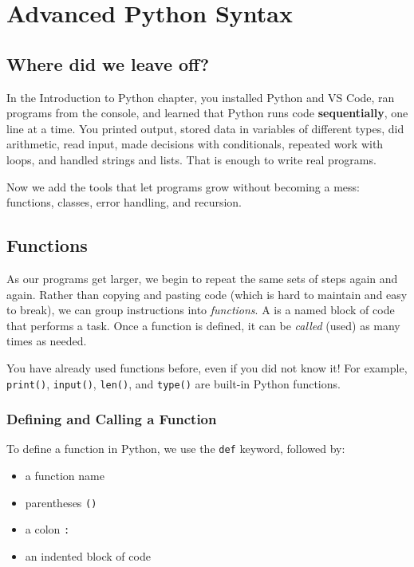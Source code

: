 \chapter{Advanced Python Syntax}
\section{Where did we leave off?}
In the Introduction to Python chapter, you installed Python and VS Code, ran programs from the console, and learned that Python runs code \textbf{sequentially}, one line at a time. You printed output, stored data in variables of different types, did arithmetic, read input, made decisions with conditionals, repeated work with loops, and handled strings and lists. That is enough to write real programs.

Now we add the tools that let programs grow without becoming a mess: functions, classes, error handling, and recursion.

\section{Functions}
As our programs get larger, we begin to repeat the same sets of steps again and again.
Rather than copying and pasting code (which is hard to maintain and easy to break),
we can group instructions into \emph{functions}. A 
is a named block of code that performs a task. Once a function is defined, it can be
\emph{called} (used) as many times as needed.

You have already used functions before, even if you did not know it! For example,
\texttt{print()}, \texttt{input()}, \texttt{len()}, and \texttt{type()}
are built-in Python functions.

\subsection{Defining and Calling a Function}
To define a function in Python, we use the \texttt{def} keyword, followed by:
\begin{itemize}
    \item a function name
    \item parentheses \texttt{()}
    \item a colon \texttt{:}
    \item an indented block of code
\end{itemize}

